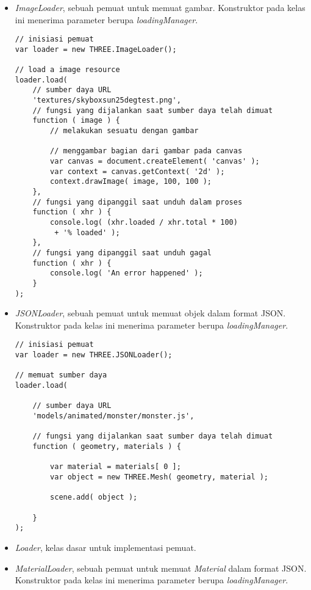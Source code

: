 \begin{itemize}
\begin{itemize}
	\item {\it ImageLoader}, sebuah pemuat untuk memuat gambar. Konstruktor pada kelas ini menerima parameter berupa  {\it loadingManager}.
	
\begin{lstlisting}[caption={Contoh penggunaan kelas {\it ImageLoader}.},captionpos=b]
// inisiasi pemuat
var loader = new THREE.ImageLoader();

// load a image resource
loader.load(
	// sumber daya URL
	'textures/skyboxsun25degtest.png',
	// fungsi yang dijalankan saat sumber daya telah dimuat
	function ( image ) {
		// melakukan sesuatu dengan gambar

		// menggambar bagian dari gambar pada canvas
		var canvas = document.createElement( 'canvas' );
		var context = canvas.getContext( '2d' );
		context.drawImage( image, 100, 100 );
	},
	// fungsi yang dipanggil saat unduh dalam proses
	function ( xhr ) {
		console.log( (xhr.loaded / xhr.total * 100)
		 + '% loaded' );
	},
	// fungsi yang dipanggil saat unduh gagal
	function ( xhr ) {
		console.log( 'An error happened' );
	}
);
\end{lstlisting}

	\item {\it JSONLoader}, sebuah pemuat untuk memuat objek dalam format JSON. Konstruktor pada kelas ini menerima parameter berupa  {\it loadingManager}.
	
\begin{lstlisting}[caption={Contoh penggunaan kelas {\it JSONLoader}.},captionpos=b]
// inisiasi pemuat
var loader = new THREE.JSONLoader();

// memuat sumber daya
loader.load(

	// sumber daya URL
	'models/animated/monster/monster.js',

	// fungsi yang dijalankan saat sumber daya telah dimuat
	function ( geometry, materials ) {

		var material = materials[ 0 ];
		var object = new THREE.Mesh( geometry, material );

		scene.add( object );

	}
);
\end{lstlisting}

	\item {\it Loader}, kelas dasar untuk implementasi pemuat.
	
	\item {\it MaterialLoader}, sebuah pemuat untuk memuat {\it Material} dalam format JSON. Konstruktor pada kelas ini menerima parameter berupa  {\it loadingManager}.
	

\end{itemize}
\end{itemize}
